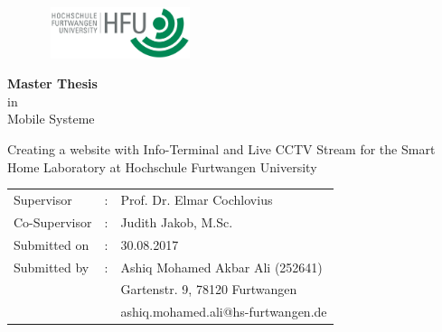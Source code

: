 \begin{titlepage}

\begin{flushright}
	\begin{figure}[ht]
	\flushright
	\includegraphics[width=4.5cm,height=1.5cm]{hfu.png}
	\end{figure}
\end{flushright}
	
\begin{center}
	\vspace{1cm}
	\Large
	\textbf{Master Thesis}\\
	in \\
	Mobile Systeme

	\vspace{2cm}
	\LARGE

	Creating a website with Info-Terminal and Live CCTV Stream for the Smart Home Laboratory at
	Hochschule Furtwangen University

\end{center}

\vfill
	
\begin{flushleft}
	\begin{table}[ht]
	\begin{tabular}{l c l}
	Supervisor		& : & Prof. Dr. Elmar Cochlovius \\
	Co-Supervisor 	& : & Judith Jakob, M.Sc. \\
	Submitted on	& : & 30.08.2017 \\
	Submitted by	& : & Ashiq Mohamed Akbar Ali (252641)\\
				&   & Gartenstr. 9, 78120 Furtwangen \\
				&   & ashiq.mohamed.ali@hs-furtwangen.de
	\end{tabular}
	\end{table}
\end{flushleft}

\cleardoublepage
\end{titlepage}